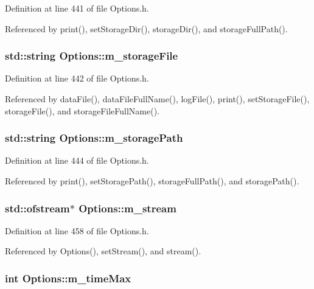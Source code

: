 Definition at line 441 of file Options.h.

Referenced by print(), setStorageDir(), storageDir(), and storageFullPath().\hypertarget{classOptions_a4d952db4e93d3aae6db86d89faa3677a}{
\subsubsection[{m\_\-storageFile}]{\setlength{\rightskip}{0pt plus 5cm}std::string {\bf Options::m\_\-storageFile}}}
\label{classOptions_a4d952db4e93d3aae6db86d89faa3677a}


Definition at line 442 of file Options.h.

Referenced by dataFile(), dataFileFullName(), logFile(), print(), setStorageFile(), storageFile(), and storageFileFullName().\hypertarget{classOptions_ad125e827cb30bc9b63875ec45b31ef5e}{
\subsubsection[{m\_\-storagePath}]{\setlength{\rightskip}{0pt plus 5cm}std::string {\bf Options::m\_\-storagePath}}}
\label{classOptions_ad125e827cb30bc9b63875ec45b31ef5e}


Definition at line 444 of file Options.h.

Referenced by print(), setStoragePath(), storageFullPath(), and storagePath().\hypertarget{classOptions_a8c5485cd614fa90de6b1aa85a7d2191b}{
\subsubsection[{m\_\-stream}]{\setlength{\rightskip}{0pt plus 5cm}std::ofstream$\ast$ {\bf Options::m\_\-stream}}}
\label{classOptions_a8c5485cd614fa90de6b1aa85a7d2191b}


Definition at line 458 of file Options.h.

Referenced by Options(), setStream(), and stream().\hypertarget{classOptions_a2584abb6745a082f73e2917732cd00e1}{
\subsubsection[{m\_\-timeMax}]{\setlength{\rightskip}{0pt plus 5cm}int {\bf Options::m\_\-timeMax}}}
\label{classOptions_a2584abb6745a082f73e2917732cd00e1}


